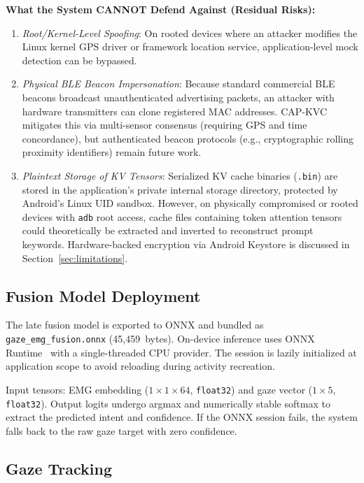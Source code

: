\documentclass[journal]{IEEEtran}
\begin{document}
\textbf{What the System CANNOT Defend Against (Residual Risks):}
\begin{enumerate}
    \item \emph{Root/Kernel-Level Spoofing}: On rooted devices where an attacker modifies the Linux kernel GPS driver or framework location service, application-level mock detection can be bypassed.
    \item \emph{Physical BLE Beacon Impersonation}: Because standard commercial BLE beacons broadcast unauthenticated advertising packets, an attacker with hardware transmitters can clone registered MAC addresses. CAP-KVC mitigates this via multi-sensor consensus (requiring GPS and time concordance), but authenticated beacon protocols (e.g., cryptographic rolling proximity identifiers) remain future work.
    \item \emph{Plaintext Storage of KV Tensors}: Serialized KV cache binaries (\texttt{.bin}) are stored in the application's private internal storage directory, protected by Android's Linux UID sandbox. However, on physically compromised or rooted devices with \texttt{adb} root access, cache files containing token attention tensors could theoretically be extracted and inverted to reconstruct prompt keywords. Hardware-backed encryption via Android Keystore is discussed in Section~\ref{sec:limitations}.
\end{enumerate}

\subsection{Fusion Model Deployment}
\label{sec:fusion_deploy}

The late fusion model is exported to ONNX and bundled as \texttt{gaze\_emg\_fusion.onnx} (45,459~bytes). On-device inference uses ONNX Runtime~\cite{onnxruntime} with a single-threaded CPU provider. The session is lazily initialized at application scope to avoid reloading during activity recreation.

Input tensors: EMG embedding ($1 \times 1 \times 64$, \texttt{float32}) and gaze vector ($1 \times 5$, \texttt{float32}). Output logits undergo argmax and numerically stable softmax to extract the predicted intent and confidence. If the ONNX session fails, the system falls back to the raw gaze target with zero confidence.

\subsection{Gaze Tracking}
\label{sec:gaze_impl}
\end{document}
